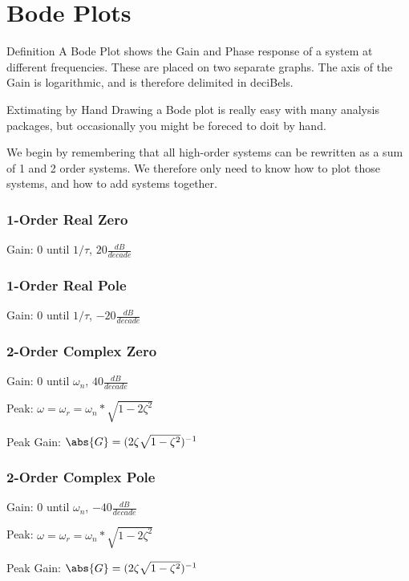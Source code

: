 \documentclass{../templates/topic}
\begin{document}
\chapter{Bode Plots}

\begin{section}{Definition}
	A Bode Plot shows the Gain and Phase response of a system at different frequencies. These are placed on two separate graphs.
	The axis of the Gain is logarithmic, and is therefore delimited in deciBels.
\end{section}

\begin{section}{Extimating by Hand}
	Drawing a Bode plot is really easy with many analysis packages, but occasionally you might be foreced to doit by hand.
	
	We begin by remembering that all high-order systems can be rewritten as a sum of 1 and 2 order systems. We therefore only need to know how to plot those systems, and how to add systems together.
	
	\subsection{1-Order Real Zero}
		Gain: 0 until $1/\tau$, $20\frac{dB}{decade}$
	\subsection{1-Order Real Pole}
		Gain: 0 until $1/\tau$, $-20\frac{dB}{decade}$
	\subsection{2-Order Complex Zero}
		Gain: 0 until $\omega_n$, $40\frac{dB}{decade}$
		
		Peak: $\omega = \omega_r = \omega_n*\sqrt{1-2\zeta^2}$
		
		Peak Gain: $\abs{G}=(2\zeta\sqrt{1-\zeta^2})^{-1}$
		
	\subsection{2-Order Complex Pole}
		Gain: 0 until $\omega_n$, $-40\frac{dB}{decade}$
	
		Peak: $\omega = \omega_r = \omega_n*\sqrt{1-2\zeta^2}$
		
		Peak Gain: $\abs{G}=(2\zeta\sqrt{1-\zeta^2})^{-1}$
	
\end{section}
\end{document}
